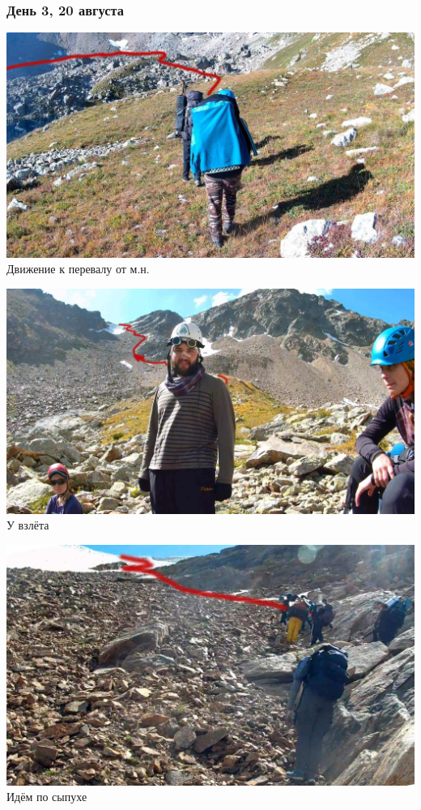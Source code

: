 \begin{frame}
	\frametitle{День 3, 20 августа}
	{\tiny
		\begin{minipage}{\fourpicsize}
			\centering
			\includegraphics[width=\textwidth]{../pics/20aug1.jpg}			
			Движение к перевалу от м.н.
		\end{minipage}
		\hfill
		\begin{minipage}{\fourpicsize}
			\centering
			\includegraphics[width=\textwidth]{../pics/20aug2.jpg}			
			У взлёта
		\end{minipage}
		\vfill
		\centering
		
		\begin{minipage}{\fourpicsize}
			\centering
			\includegraphics[width=\textwidth]{../pics/20aug3.jpg}			
			Идём по сыпухе		
		\end{minipage}
		\hfill
		
	}
\end{frame}


